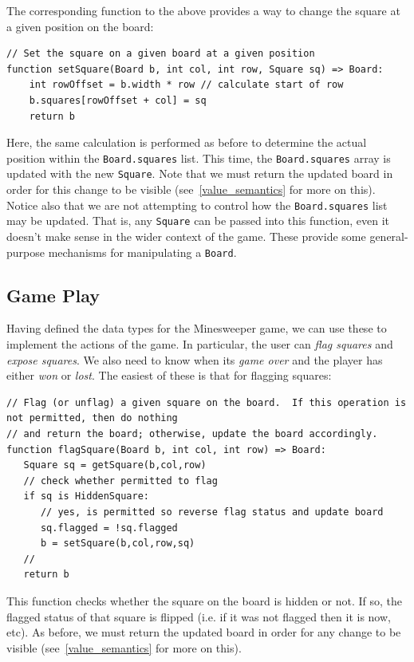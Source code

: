 The corresponding function to the above provides a way to change the square at a given position on the board:

\begin{lstlisting}
// Set the square on a given board at a given position
function setSquare(Board b, int col, int row, Square sq) => Board:
    int rowOffset = b.width * row // calculate start of row
    b.squares[rowOffset + col] = sq
    return b
\end{lstlisting}

Here, the same calculation is performed as before to determine the actual position within the \lstinline{Board.squares} list.  This time, the \lstinline{Board.squares} array is updated with the new \lstinline{Square}.  Note that we must return the updated board in order for this change to be visible (see~\ref{value_semantics} for more on this).  Notice also that we are not attempting to control how the \lstinline{Board.squares} list may be updated.  That is, any \lstinline{Square} can be passed into this function, even it doesn't make sense in the wider context of the game.  These provide some general-purpose mechanisms for manipulating a \lstinline{Board}.

\subsection{Game Play}

Having defined the data types for the Minesweeper game, we can use these to implement the actions of the game.  In particular, the user can {\em flag squares} and {\em expose squares}.  We also need to know when its {\em game over} and the player has either {\em won} or {\em lost}.  The easiest of these is that for flagging squares:

\begin{lstlisting}
// Flag (or unflag) a given square on the board.  If this operation is not permitted, then do nothing
// and return the board; otherwise, update the board accordingly.
function flagSquare(Board b, int col, int row) => Board:
   Square sq = getSquare(b,col,row)
   // check whether permitted to flag
   if sq is HiddenSquare:
      // yes, is permitted so reverse flag status and update board
      sq.flagged = !sq.flagged
      b = setSquare(b,col,row,sq)
   //
   return b
\end{lstlisting}

This function checks whether the square on the board is hidden or not.  If so, the flagged status of that square is flipped (i.e. if it was not flagged then it is now, etc).  As before,  we must return the updated board in order for any change to be visible (see~\ref{value_semantics} for more on this).

